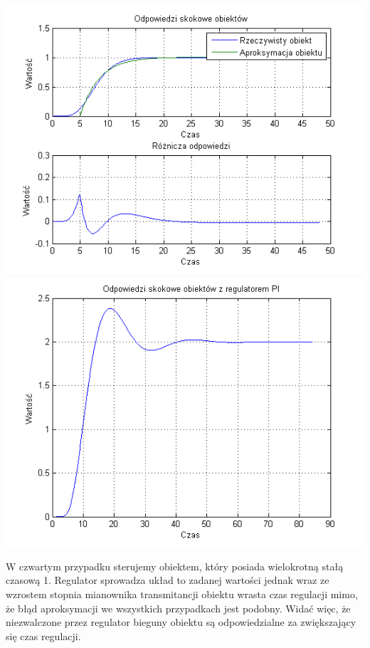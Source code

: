 \documentclass[10pt,a4paper]{article}
\begin{document}
\begin{center}
\includegraphics[scale=1]{images/jeden/skrypt_115.png}\\
\includegraphics[scale=1]{images/jeden/skrypt_116.png}\\
\end{center}
\newpage
W czwartym przypadku sterujemy obiektem, który posiada wielokrotną stałą czasową 1. Regulator sprowadza układ to zadanej wartości jednak wraz ze wzrostem stopnia mianownika transmitancji obiektu wrasta czas regulacji mimo, że błąd aproksymacji we wszystkich przypadkach jest podobny. Widać więc, że niezwalczone przez regulator bieguny obiektu są odpowiedzialne za zwiększający się czas regulacji.
\newpage
\end{document}
